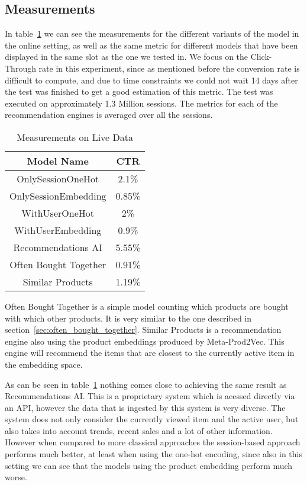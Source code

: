 \subsection{Measurements}
In table~\ref{tab:online_measurements} we can see the measurements for the different variants of the model in the online setting, as well as the same metric for different models that have been displayed in the same slot as the one we tested in.
We focus on the Click-Through rate in this experiment, since as mentioned before the conversion rate is difficult to compute, and due to time constraints we could not wait 14 days after the test was finished to get a good estimation of this metric.
The test was executed on approximately 1.3 Million sessions.
The metrics for each of the recommendation engines is averaged over all the sessions.
\begin{table}[t]
    \centering
    \begin{tabular}{|c|c|}
        \hline
        Model Name & CTR \\ \hline
        OnlySessionOneHot & 2.1\% \\ \hline
        OnlySessionEmbedding & 0.85\% \\ \hline
        WithUserOneHot & 2\% \\ \hline
        WithUserEmbedding & 0.9\% \\ \hline
        Recommendations AI & 5.55\% \\ \hline
        Often Bought Together & 0.91\% \\ \hline
        Similar Products & 1.19\% \\ \hline
    \end{tabular}
    \caption{Measurements on Live Data}
    \label{tab:online_measurements}
\end{table}
Often Bought Together is a simple model counting which products are bought with which other products.
It is very similar to the one described in section~\ref{sec:often_bought_together}.
Similar Products is a recommendation engine also using the product embeddings produced by Meta-Prod2Vec.
This engine will recommend the items that are closest to the currently active item in the embedding space.
\par
As can be seen in table~\ref{tab:online_measurements} nothing comes close to achieving the same result as Recommendations AI.
This is a proprietary system which is acessed directly via an API, however the data that is ingested by this system is very diverse.
The system does not only consider the currently viewed item and the active user, but also takes into account trends, recent sales and a lot of other information.
However when compared to more classical approaches the session-based approach performs much better, at least when using the one-hot encoding, since also in this setting we can see that the models using the product embedding perform much worse.